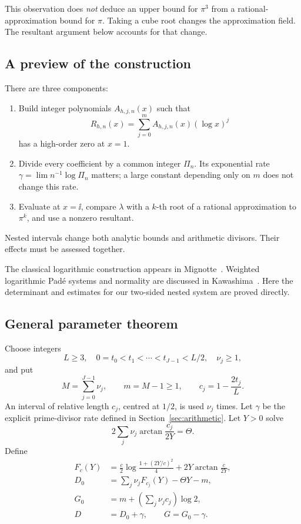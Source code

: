 This observation does \emph{not} deduce an upper bound for \(\pi^3\)
from a rational-approximation bound for \(\pi\). Taking a cube root
changes the approximation field. The resultant argument below accounts
for that change.

\subsection{A preview of the construction}

There are three components:
\begin{enumerate}
\item Build integer polynomials \(A_{h,j,n}(x)\) such that
\[
R_{h,n}(x)=\sum_{j=0}^{m}A_{h,j,n}(x)(\log x)^j
\]
has a high-order zero at \(x=1\).
\item Divide every coefficient by a common integer \(\Pi_n\).
Its exponential rate \(\gamma=\lim n^{-1}\log\Pi_n\) matters;
a large constant depending only on \(m\) does not change this rate.
\item Evaluate at \(x=\ii\), compare \(\lambda\) with a \(k\)-th root
of a rational approximation to \(\pi^k\), and use a nonzero resultant.
\end{enumerate}
Nested intervals change both analytic bounds and arithmetic divisors.
Their effects must be assessed together.

The classical logarithmic construction appears in
Mignotte~\cite{Mignotte}. Weighted logarithmic Pad\'e systems and
normality are discussed in Kawashima~\cite{Kawashima}.
Here the determinant and estimates for our two-sided nested system
are proved directly.

\subsection{General parameter theorem}

Choose integers
\[
L\ge3,\quad 0=t_0<t_1<\cdots<t_{J-1}<L/2,\quad \nu_j\ge1,
\]
and put
\[
M=\sum_{j=0}^{J-1}\nu_j,\qquad m=M-1\ge1,\qquad
c_j=1-\frac{2t_j}{L}.
\]
An interval of relative length \(c_j\), centred at \(1/2\), is used
\(\nu_j\) times. Let \(\gamma\) be the explicit prime-divisor rate
defined in Section~\ref{sec:arithmetic}. Let \(Y>0\) solve
\begin{equation}\label{eq:rootpreview}
2\sum_j\nu_j\arctan\frac{c_j}{2Y}=\Theta.
\end{equation}
Define
\begin{align}
F_c(Y)&=\frac c2\log\frac{1+(2Y/c)^2}{4}
             +2Y\arctan\frac{c}{2Y},\label{eq:Fdef}\\
D_0&=\sum_j\nu_jF_{c_j}(Y)-\Theta Y-m,\label{eq:D0def}\\
G_0&=m+\left(\sum_j\nu_jc_j\right)\log2,\label{eq:G0def}\\
D&=D_0+\gamma,\qquad G=G_0-\gamma.\label{eq:DGdef}
\end{align}

